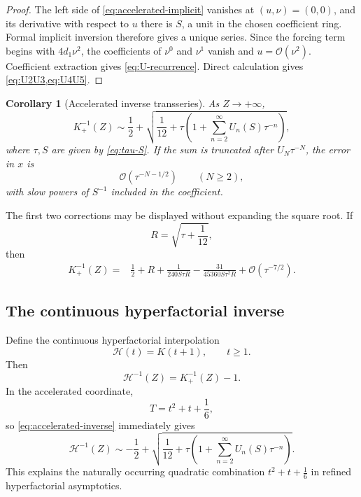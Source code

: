 \documentclass[11pt,a4paper]{article}
\numberwithin{equation}{section}
\newtheorem{corollary}[theorem]{Corollary}
\theoremstyle{remark}
\newcommand{\Kinv}{K_{+}^{-1}}
\newcommand{\bigO}{\mathcal O}
\begin{document}
\begin{proof}
The left side of \cref{eq:accelerated-implicit} vanishes at
\((u,\nu)=(0,0)\), and its derivative with respect to \(u\) there is \(S\),
a unit in the chosen coefficient ring.  Formal implicit inversion therefore
gives a unique series.  Since the forcing term begins with
\(4d_1\nu^2\), the coefficients of \(\nu^0\) and \(\nu^1\) vanish and
\(u=\bigO(\nu^2)\).  Coefficient extraction gives
\cref{eq:U-recurrence}.  Direct calculation gives
\cref{eq:U2U3,eq:U4U5}.
\end{proof}

\begin{corollary}[Accelerated inverse transseries]
\label{cor:accelerated-inverse}
As \(Z\to+\infty\),
\begin{equation}
\boxed{
\Kinv(Z)\sim
\frac12+
\sqrt{\frac1{12}+
\tau\left(1+\sum_{n=2}^{\infty}U_n(S)\tau^{-n}\right)},
}
\label{eq:accelerated-inverse}
\end{equation}
where \(\tau,S\) are given by \cref{eq:tau-S}.  If the sum is truncated after
\(U_N\tau^{-N}\), the error in \(x\) is
\begin{equation}
\bigO\!\left(\tau^{-N-1/2}\right)
\qquad (N\ge2),
\label{eq:accelerated-error}
\end{equation}
with slow powers of \(S^{-1}\) included in the coefficient.
\end{corollary}

The first two corrections may be displayed without expanding the square
root.  If
\[
R=\sqrt{\tau+\frac1{12}},
\]
then
\begin{align}
\Kinv(Z)
={}&\frac12+R
+\frac{1}{240S\tau R}
-\frac{31}{45360S\tau^2R}
+\bigO\!\left(\tau^{-7/2}\right).
\label{eq:accelerated-expanded-x}
\end{align}

\subsection{The continuous hyperfactorial inverse}

Define the continuous hyperfactorial interpolation
\[
\mathcal H(t)=K(t+1),
\qquad t\ge1.
\]
Then
\begin{equation}
\mathcal H^{-1}(Z)=\Kinv(Z)-1.
\label{eq:H-inverse-shift}
\end{equation}
In the accelerated coordinate,
\[
T=t^2+t+\frac16,
\]
so \cref{eq:accelerated-inverse} immediately gives
\begin{equation}
\mathcal H^{-1}(Z)\sim
-\frac12+
\sqrt{\frac1{12}+
\tau\left(1+\sum_{n=2}^{\infty}U_n(S)\tau^{-n}\right)}.
\label{eq:H-inverse}
\end{equation}
This explains the naturally occurring quadratic combination
\(t^2+t+\tfrac16\) in refined hyperfactorial asymptotics.
\end{document}
